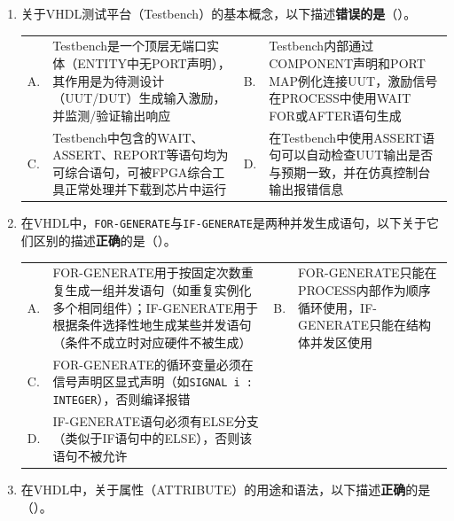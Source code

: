 \begin{enumerate}[label=\arabic*.]
\vspace{0.8cm}

\item 关于VHDL测试平台（Testbench）的基本概念，以下描述\textbf{错误的是}（\quad）。

\vspace{0.3cm}

\begin{tabular}{@{}lp{}@{\qquad}lp{}@{}}
A. & Testbench是一个顶层无端口实体（ENTITY中无PORT声明），其作用是为待测设计（UUT/DUT）生成输入激励，并监测/验证输出响应 &
B. & Testbench内部通过COMPONENT声明和PORT MAP例化连接UUT，激励信号在PROCESS中使用WAIT FOR或AFTER语句生成 \\
C. & Testbench中包含的WAIT、ASSERT、REPORT等语句均为可综合语句，可被FPGA综合工具正常处理并下载到芯片中运行 &
D. & 在Testbench中使用ASSERT语句可以自动检查UUT输出是否与预期一致，并在仿真控制台输出报错信息 \\
\end{tabular}

\vspace{0.8cm}

\item 在VHDL中，\texttt{FOR-GENERATE}与\texttt{IF-GENERATE}是两种并发生成语句，以下关于它们区别的描述\textbf{正确}的是（\quad）。

\vspace{0.3cm}

\begin{tabular}{@{}lp{}@{\qquad}lp{}@{}}
A. & FOR-GENERATE用于按固定次数重复生成一组并发语句（如重复实例化多个相同组件）；IF-GENERATE用于根据条件选择性地生成某些并发语句（条件不成立时对应硬件不被生成） &
B. & FOR-GENERATE只能在PROCESS内部作为顺序循环使用，IF-GENERATE只能在结构体并发区使用 \\
C. & FOR-GENERATE的循环变量必须在信号声明区显式声明（如\texttt{SIGNAL i : INTEGER}），否则编译报错 \\
D. & IF-GENERATE语句必须有ELSE分支（类似于IF语句中的ELSE），否则该语句不被允许 \\
\end{tabular}

\vspace{0.8cm}

\item 在VHDL中，关于属性（ATTRIBUTE）的用途和语法，以下描述\textbf{正确}的是（\quad）。

\vspace{0.3cm}


\end{enumerate}
